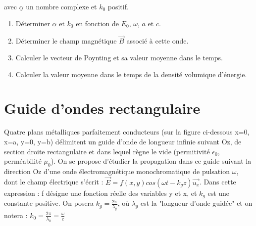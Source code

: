 \documentclass{article}
\begin{document}
avec $\underline{\alpha}$ un nombre complexe et $k_0$ positif. 

\begin{enumerate}
  \item Déterminer $\underline{\alpha}$ et $k_0$ en fonction de $E_0$, $\omega$, $a$ et $c$. 
  \item Déterminer le champ magnétique $\vec{B}$ associé à cette onde. 
  \item Calculer le vecteur de Poynting et sa valeur moyenne dans le temps. 
  \item Calculer la valeur moyenne dans le temps de la densité volumique d'énergie. 
\end{enumerate}

\section{Guide d'ondes rectangulaire}
Quatre plans métalliques parfaitement conducteurs (sur la figure ci-dessous x=0, x=a, y=0,
y=b) délimitent un guide d’onde de longueur infinie suivant Oz, de section droite rectangulaire et dans lequel règne le vide (permitivité $\epsilon_0$, perméabilité $\mu_0$).
On se propose d’étudier la propagation dans ce guide suivant la direction Oz d’une onde
électromagnétique monochromatique de pulsation $\omega$, dont le champ électrique s’écrit :
$\vec{E}=f(x,y)cos(\omega t-k_g z)\vec{u_x}$. Dans cette expression : f désigne une fonction réelle des 
variables y et x, et $ k_g$ est une constante positive. On posera $k_g=\frac{2\pi}{\lambda_g}$, où $\lambda_g$ est  la  "longueur d’onde
guidée" et on notera : $k_0 = \frac{2\pi}{\lambda_0}=\frac{\omega}{c}$
\end{document}
